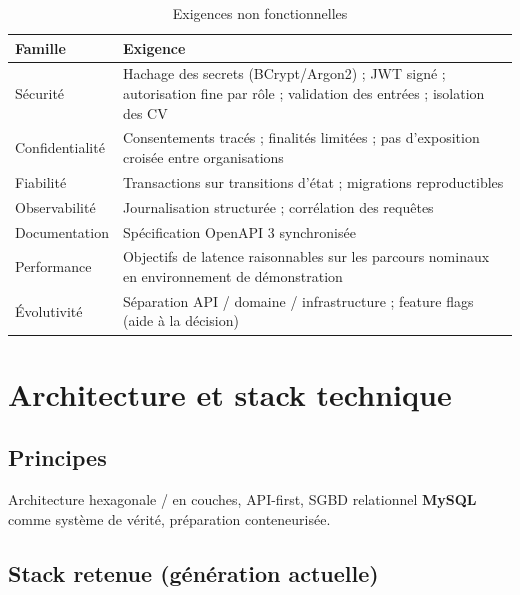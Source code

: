 \documentclass[12pt,a4paper,oneside]{report}
\begin{document}
\begin{table}[H]
\centering
\caption{Exigences non fonctionnelles}
\begin{tabularx}{\textwidth}{@{}lX@{}}
\toprule
\textbf{Famille} & \textbf{Exigence} \\
\midrule
Sécurité & Hachage des secrets (BCrypt/Argon2) ; JWT signé ; autorisation fine par rôle ; validation des entrées ; isolation des CV \\
Confidentialité & Consentements tracés ; finalités limitées ; pas d'exposition croisée entre organisations \\
Fiabilité & Transactions sur transitions d'état ; migrations reproductibles \\
Observabilité & Journalisation structurée ; corrélation des requêtes \\
Documentation & Spécification OpenAPI 3 synchronisée \\
Performance & Objectifs de latence raisonnables sur les parcours nominaux en environnement de démonstration \\
Évolutivité & Séparation API / domaine / infrastructure ; feature flags (aide à la décision) \\
\bottomrule
\end{tabularx}
\end{table}

\chapter{Architecture et stack technique}
\label{ch:arch}

\section{Principes}
Architecture hexagonale / en couches, API-first, SGBD relationnel \textbf{MySQL} comme système de vérité, préparation conteneurisée.

\section{Stack retenue (génération actuelle)}
\end{document}
